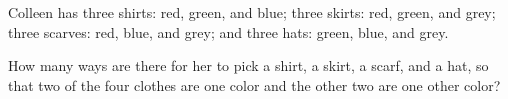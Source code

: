 Colleen has three shirts: red, green, and blue; three skirts: red, green, and grey; three scarves: red, blue, and grey; and three hats: green, blue, and grey.



How many ways are there for her to pick a shirt, a skirt, a scarf, and a hat, so that two of the four clothes are one color and the other two are one other color?
